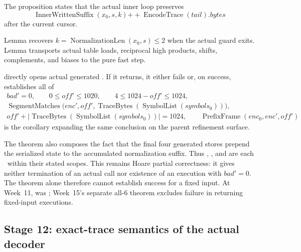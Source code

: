 \begin{verified}
The proposition  states that the actual
inner loop preserves
\[
  \operatorname{InnerWrittenSuffix}(x_0,s,k)
  \mathbin{+\!\!+}\operatorname{EncodeTrace}(tail).bytes
\]
after the current cursor.

Lemma  recovers
\(k=\operatorname{NormalizationLen}(x_0,s)\le2\) when the actual guard exits.
Lemma  transports actual
table loads, reciprocal high products, shifts, complements, and biases
to the pure fast step.
\end{verified}

\begin{verified}
 directly opens actual generated
. If it returns, it either fails
or, on success, establishes all of
\[
\begin{gathered}
  bad'=0,\qquad 0\le off'\le1020,\qquad
  4\le1024-off'\le1024,\\
  \operatorname{SegmentMatches}
    \bigl(enc',off',
      \operatorname{TraceBytes}(\operatorname{SymbolList}(symbols_0))\bigr),\\
  off'+\left|
    \operatorname{TraceBytes}(\operatorname{SymbolList}(symbols_0))
  \right|=1024,\qquad
  \operatorname{PrefixFrame}(enc_0,enc',off')
\end{gathered}
\]
 is the corollary expanding
the same conclusion on the parent refinement surface.
\end{verified}

The theorem also composes the fact that the final four generated stores prepend
the serialized state to the accumulated normalization suffix.
Thus ,
, and
 are each \statusproved\ within their stated
scopes. This remains Hoare partial correctness: it gives neither termination
of an actual call nor existence of an execution with \(bad'=0\).
The theorem alone therefore cannot establish success for a fixed input.
At Week~11,  was \statuspartial;
Week~15's separate all-6 theorem excludes failure in returning fixed-input
executions.

\subsection{Stage 12: exact-trace semantics of the actual decoder}

